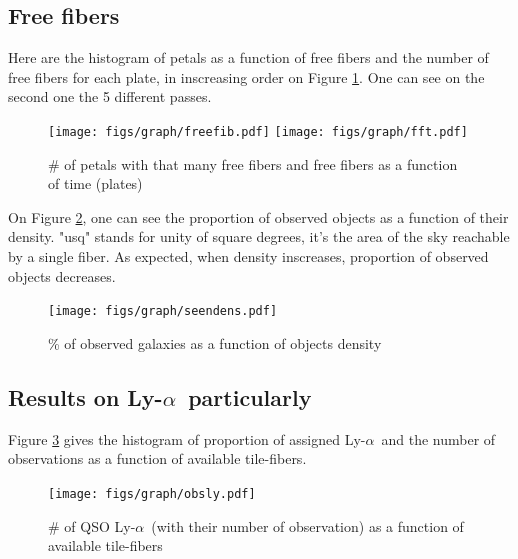 \documentclass{article}
\def\lya{Ly-$\alpha$\ }
\begin{document}


\subsection{Free fibers}
Here are the histogram of petals as a function of free fibers and the number of free fibers for each plate, in inscreasing order on Figure \ref{fft}. One can see on the second one the 5 different passes.

\begin{figure}[H]\begin{center}
	\texttt{[image: figs/graph/freefib.pdf]}
	\texttt{[image: figs/graph/fft.pdf]}\hfill
	\caption{\# of petals with that many free fibers and free fibers as a function of time (plates)}\label{fft}
\end{center}\end{figure}

On Figure \ref{seendens}, one can see the proportion of observed objects as a function of their density. "usq" stands for unity of square degrees, it's the area of the sky reachable by a single fiber. As expected, when density inscreases, proportion of observed objects decreases.

\begin{figure}[H]\begin{center}
	\texttt{[image: figs/graph/seendens.pdf]}
	\caption{\% of observed galaxies as a function of objects density}\label{seendens}
\end{center}\end{figure}


\subsection{Results on \lya particularly}
Figure \ref{histastf} gives the histogram of proportion of assigned \lya and the number of observations as a function of available tile-fibers.

\begin{figure}[H]\begin{center}
	\texttt{[image: figs/graph/obsly.pdf]}
	\caption{\# of QSO \lya (with their number of observation) as a function of available tile-fibers}\label{histastf}
\end{center}\end{figure}
\end{document}
